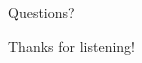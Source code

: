\begin{frame}[standout]
  Questions?
\end{frame}

\begin{frame}[standout]
Thanks for listening!
\end{frame}